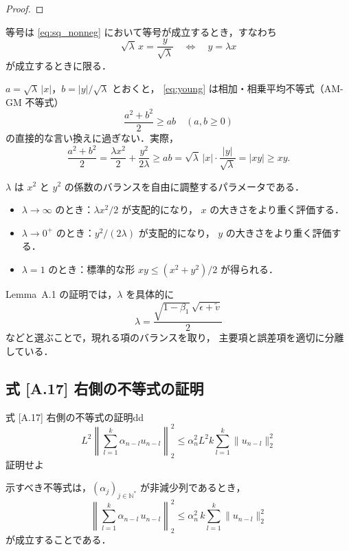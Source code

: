 \documentclass[dvipdfmx,a4paper,11pt]{jsarticle}
\begin{document}
\begin{proof}
\end{proof}

\begin{rem}[等号条件]
等号は \eqref{eq:sq_nonneg} において等号が成立するとき，すなわち
\begin{equation}
    \sqrt{\lambda}\,x = \frac{y}{\sqrt{\lambda}}
    \quad \Longleftrightarrow \quad
    y = \lambda x
\end{equation}
が成立するときに限る．
\end{rem}

\begin{rem}[AM-GM 不等式との関係]
$a = \sqrt{\lambda}\,|x|$，$b = |y|/\sqrt{\lambda}$ とおくと，
\eqref{eq:young} は相加・相乗平均不等式（AM-GM 不等式）
\begin{equation}
    \frac{a^2 + b^2}{2} \geq ab
    \quad (a, b \geq 0)
\end{equation}
の直接的な言い換えに過ぎない．実際，
\begin{equation}
    \frac{a^2 + b^2}{2}
    = \frac{\lambda x^2}{2} + \frac{y^2}{2\lambda}
    \geq ab
    = \sqrt{\lambda}\,|x| \cdot \frac{|y|}{\sqrt{\lambda}}
    = |xy|
    \geq xy.
\end{equation}
\end{rem}

\begin{rem}
$\lambda$ は $x^2$ と $y^2$ の係数のバランスを自由に調整するパラメータである．
\begin{itemize}
    \item $\lambda \to \infty$ のとき：$\lambda x^2 / 2$ が支配的になり，
          $x$ の大きさをより重く評価する．
    \item $\lambda \to 0^+$ のとき：$y^2 / (2\lambda)$ が支配的になり，
          $y$ の大きさをより重く評価する．
    \item $\lambda = 1$ のとき：標準的な形 $xy \leq (x^2 + y^2)/2$ が得られる．
\end{itemize}
Lemma~A.1 の証明では，$\lambda$ を具体的に
\begin{equation}
    \lambda = \frac{\sqrt{1-\beta_1}\,\sqrt{\epsilon + \tilde{v}}}{2}
\end{equation}
などと選ぶことで，現れる項のバランスを取り，
主要項と誤差項を適切に分離している．
\end{rem}
\subsection{式 [A.17] 右側の不等式の証明}\label{pf:a17}
\begin{reidai}{式 [A.17] 右側の不等式の証明}{dd}
$$
    L^2 \left\|\sum_{l=1}^{k} \alpha_{n-l} u_{n-l}\right\|_2^2\leq \alpha_n^2 L^2 k \sum_{l=1}^{k} \|u_{n-l}\|_2^2 
$$
証明せよ

\end{reidai}
示すべき不等式は，$(\alpha_j)_{j \in \mathbb{N}^*}$ が非減少列であるとき，
\begin{equation}
    \left\|\sum_{l=1}^{k} \alpha_{n-l}\, u_{n-l}\right\|_2^2
    \leq \alpha_n^2\, k \sum_{l=1}^{k} \|u_{n-l}\|_2^2
    \label{eq:target}
\end{equation}
が成立することである．
\end{document}
